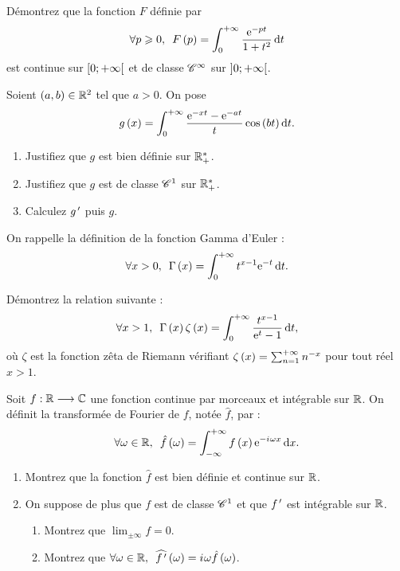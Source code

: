 \begin{exoss}
Démontrez que la fonction \(F\) définie par \[\quantifs{\forall p\geq0}F\paren{p}=\int_0^{\pinf}\dfrac{\e{-pt}}{1+t^2}\odif{t}\] est continue sur \(\left[0;+\infty\right[\) et de classe \(\mathscr{C}^{\infty}\) sur \(\left]0;+\infty\right[\).
\end{exoss}

\begin{exoss}
Soient \(\left(a,b\right)\in\mathbb{R}^2\) tel que \(a>0\). On pose \[g\paren{x}=\int_0^{\pinf}\dfrac{\e{-xt}-\e{-at}}{t}\cos\paren{bt}\odif{t}.\]

\begin{enumerate}
    \item Justifiez que \(g\) est bien définie sur \(\mathbb{R}_+^*\). \\
    \item Justifiez que \(g\) est de classe \(\mathscr{C}^{1}\) sur \(\mathbb{R}_+^*\). \\
    \item Calculez \(g^{\,\prime}\) puis \(g\).
\end{enumerate}
\end{exoss}

\begin{exoss}
On rappelle la définition de la fonction Gamma d'Euler : \[\quantifs{\forall x>0}\Gamma\paren{x}=\int_0^{\pinf}t^{x-1}\e{-t}\odif{t}.\]

Démontrez la relation suivante : \[\quantifs{\forall x>1}\Gamma\paren{x}\zeta\paren{x}=\int_0^{\pinf}\dfrac{t^{x-1}}{\e{t}-1}\odif{t},\] où \(\zeta\) est la fonction zêta de Riemann vérifiant \(\zeta\left(x\right)=\sum_{n=1}^{+\infty}n^{-x}\) pour tout réel \(x>1\).
\end{exoss}

\begin{exoss}
Soit \(f:\mathbb{R}\longrightarrow\mathbb{C}\) une fonction continue par morceaux et intégrable sur \(\mathbb{R}\). On définit la transformée de Fourier de \(f\), notée \(\hat{f}\), par : \[\quantifs{\forall\omega\in\R}\hat{f}\paren{\omega}=\int_{\minf}^{\pinf}f\paren{x}\e{-\i\omega x}\odif{x}.\]

\begin{enumerate}
    \item Montrez que la fonction \(\hat{f}\) est bien définie et continue sur \(\mathbb{R}\). \\
    \item On suppose de plus que \(f\) est de classe \(\mathscr{C}^{1}\) et que \(f^{\,\prime}\) est intégrable sur \(\mathbb{R}\). \\ \begin{enumerate}
        \item Montrez que \(\lim_{\pm\infty}f=0\). \\
        \item Montrez que \(\quantifs{\forall\omega\in\R}\widehat{f\prim}\paren{\omega}=\i\omega\hat{f}\paren{\omega}\).
    \end{enumerate}
\end{enumerate}
\end{exoss}

